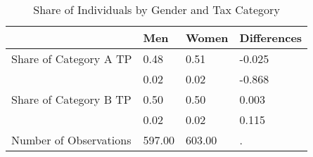 \begin{table}[htbp]
\caption{\label{tab:table9} Share of Individuals by Gender and Tax Category}\centering\medskip
\begin{tabular}{llll} \hline \hline
 & Men  & Women  & Differences  \\  \hline 
Share of Category A TP &         0.48 &         0.51 &    -0.025 \\  
 &         0.02 &         0.02 &    -0.868 \\  
Share of Category B TP &         0.50 &         0.50 &     0.003 \\  
 &         0.02 &         0.02 &     0.115 \\  
Number of Observations &       597.00 &       603.00 &         . \\  
\hline \hline \end{tabular}
\end{table}
